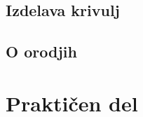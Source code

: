 \documentclass[a4paper, 12pt]{article}
\begin{document}
\begin{sloppypar}
	\subsection{Izdelava krivulj}
	
	
	\subsection{O orodjih}
	
	
	\newpage
	\section{Praktičen del}
	
	
	
	
	
	
	
	
	
	
	
\end{sloppypar}

\newpage

\renewcommand{\refname}{Viri}



\end{document}
